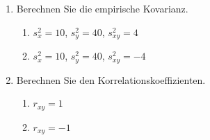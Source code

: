 \begin{enumerate}[1.]
\begin{figure}[h]
\begin{minipage}[b]{0.45\textwidth}
                \caption{}
            \end{minipage}
        \end{figure}
    \item Berechnen Sie die empirische Kovarianz.
        \begin{enumerate}
            \item $s^2_x = 10$, $s^2_y = 40$, $s^2_{xy} = 4$
            \item $s^2_x = 10$, $s^2_y = 40$, $s^2_{xy} = -4$
        \end{enumerate}
    \item Berechnen Sie den Korrelationskoeffizienten.
        \begin{enumerate}
            \item $r_{xy} = 1$
            \item $r_{xy} = -1$
        \end{enumerate}
\end{enumerate}
